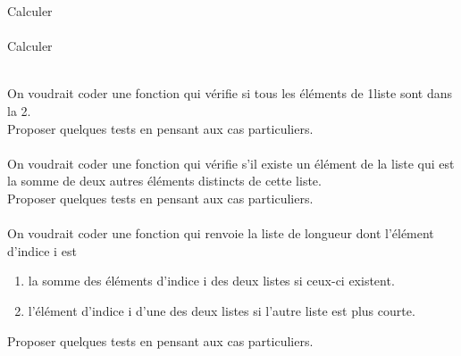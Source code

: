 \documentclass[a4paper,12pt]{article}
\begin{document}



Calculer \\

\\


Calculer \\

\\

\newpage

On voudrait coder une fonction  qui vérifie si tous les éléments de 1\ere liste sont dans la 2\eme.\\

Proposer quelques tests en pensant aux cas particuliers.\\

\\



On voudrait coder une fonction  qui vérifie s'il existe un élément de la liste qui est la somme de deux autres éléments distincts de cette liste.\\
Proposer quelques tests en pensant aux cas particuliers.\\

\\

\newpage 
On voudrait coder une fonction  qui renvoie la liste de longueur  dont l'élément d'indice i est
\begin{enumerate}[--]
	\item 	la somme des éléments d'indice i des deux listes si ceux-ci existent.
	\item 	l'élément d'indice i d'une des deux listes si l'autre liste est plus courte.
\end{enumerate}

Proposer quelques tests en pensant aux cas particuliers.\\

\end{document}
